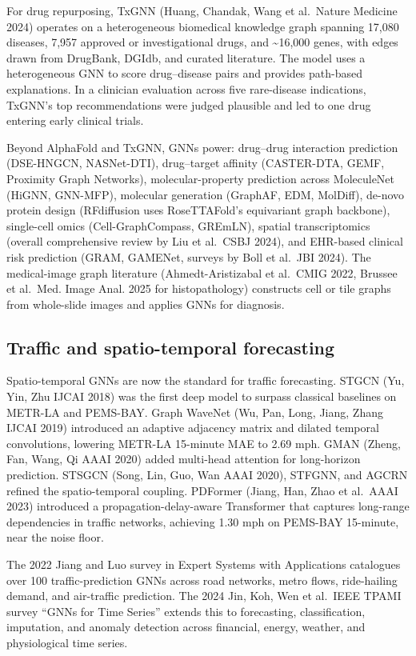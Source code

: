 For drug repurposing, TxGNN (Huang, Chandak, Wang et al.~Nature Medicine 2024) operates on a heterogeneous biomedical knowledge graph spanning 17,080 diseases, 7,957 approved or investigational drugs, and \textasciitilde16,000 genes, with edges drawn from DrugBank, DGIdb, and curated literature. The model uses a heterogeneous GNN to score drug--disease pairs and provides path-based explanations. In a clinician evaluation across five rare-disease indications, TxGNN's top recommendations were judged plausible and led to one drug entering early clinical trials.

Beyond AlphaFold and TxGNN, GNNs power: drug--drug interaction prediction (DSE-HNGCN, NASNet-DTI), drug--target affinity (CASTER-DTA, GEMF, Proximity Graph Networks), molecular-property prediction across MoleculeNet (HiGNN, GNN-MFP), molecular generation (GraphAF, EDM, MolDiff), de-novo protein design (RFdiffusion uses RoseTTAFold's equivariant graph backbone), single-cell omics (Cell-GraphCompass, GREmLN), spatial transcriptomics (overall comprehensive review by Liu et al.~CSBJ 2024), and EHR-based clinical risk prediction (GRAM, GAMENet, surveys by Boll et al.~JBI 2024). The medical-image graph literature (Ahmedt-Aristizabal et al.~CMIG 2022, Brussee et al.~Med. Image Anal. 2025 for histopathology) constructs cell or tile graphs from whole-slide images and applies GNNs for diagnosis.

\subsection{Traffic and spatio-temporal forecasting}\label{traffic-and-spatio-temporal-forecasting}

Spatio-temporal GNNs are now the standard for traffic forecasting. STGCN (Yu, Yin, Zhu IJCAI 2018) was the first deep model to surpass classical baselines on METR-LA and PEMS-BAY. Graph WaveNet (Wu, Pan, Long, Jiang, Zhang IJCAI 2019) introduced an adaptive adjacency matrix and dilated temporal convolutions, lowering METR-LA 15-minute MAE to 2.69 mph. GMAN (Zheng, Fan, Wang, Qi AAAI 2020) added multi-head attention for long-horizon prediction. STSGCN (Song, Lin, Guo, Wan AAAI 2020), STFGNN, and AGCRN refined the spatio-temporal coupling. PDFormer (Jiang, Han, Zhao et al.~AAAI 2023) introduced a propagation-delay-aware Transformer that captures long-range dependencies in traffic networks, achieving 1.30 mph on PEMS-BAY 15-minute, near the noise floor.

The 2022 Jiang and Luo survey in Expert Systems with Applications catalogues over 100 traffic-prediction GNNs across road networks, metro flows, ride-hailing demand, and air-traffic prediction. The 2024 Jin, Koh, Wen et al.~IEEE TPAMI survey ``GNNs for Time Series'' extends this to forecasting, classification, imputation, and anomaly detection across financial, energy, weather, and physiological time series.

